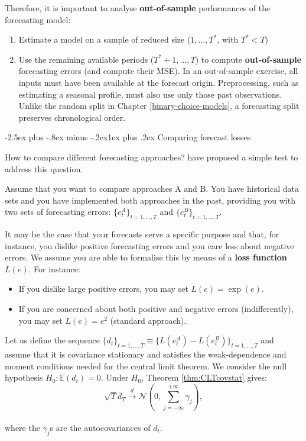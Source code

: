 \documentclass[
  11pt,
]{book}
\makeatletter
\providecommand{\tightlist}{%
  \setlength{\itemsep}{0pt}\setlength{\parskip}{0pt}}
\renewcommand\subsection{\@startsection{subsection}{2}{\z@}
  {-2.5ex plus -.8ex minus -.2ex}{1ex plus .2ex}
  {\normalfont\large\bfseries\color{TextbookInk}}}
\theoremstyle{definition}
\theoremstyle{definition}
\theoremstyle{definition}
\theoremstyle{definition}
\theoremstyle{remark}
\makeatother
\begin{document}
Therefore, it is important to analyse \textbf{out-of-sample} performances of the forecasting model:

\begin{enumerate}
\def\labelenumi{\alph{enumi}.}
\tightlist
\item
  Estimate a model on a sample of reduced size (\(1,\dots,T^*\), with \(T^*<T\))
\item
  Use the remaining available periods (\(T^*+1,\dots,T\)) to compute \textbf{out-of-sample} forecasting errors (and compute their MSE). In an out-of-sample exercise, all inputs must have been available at the forecast origin. Preprocessing, such as estimating a seasonal profile, must also use only those past observations. Unlike the random split in Chapter \ref{binary-choice-models}, a forecasting split preserves chronological order.
\end{enumerate}

\subsection{Comparing forecast losses}\label{forecast-losses}

How to compare different forecasting approaches? \citet{Diebold_Mariano_1995} have proposed a simple test to address this question.

Assume that you want to compare approaches A and B. You have historical data sets and you have implemented both approaches in the past, providing you with two sets of forecasting errors: \(\{e^{A}_t\}_{t=1,\dots,T}\) and \(\{e^{B}_t\}_{t=1,\dots,T}\).

It may be the case that your forecasts serve a specific purpose and that, for instance, you dislike positive forecasting errors and you care less about negative errors. We assume you are able to formalise this by means of a \textbf{loss function \(L(e)\)}. For instance:

\begin{itemize}
\tightlist
\item
  If you dislike large positive errors, you may set \(L(e)=\exp(e)\).
\item
  If you are concerned about both positive and negative errors (indifferently), you may set \(L(e)=e^2\) (standard approach).
\end{itemize}

Let us define the sequence \(\{d_t\}_{t=1,\dots,T} \equiv \{L(e^{A}_t)-L(e^{B}_t)\}_{t=1,\dots,T}\) and assume that it is covariance stationary and satisfies the weak-dependence and moment conditions needed for the central limit theorem. We consider the null hypothesis \(H_0:\mathbb{E}(d_t)=0\). Under \(H_0\), Theorem \ref{thm:CLTcovstat} gives:
\[
\sqrt{T} \bar{d}_T \overset{d}{\rightarrow} \mathcal{N}\left(0,\sum_{j=-\infty}^{+\infty} \gamma_j \right),
\]\\
where the \(\gamma_j\)s are the autocovariances of \(d_t\).
\end{document}
